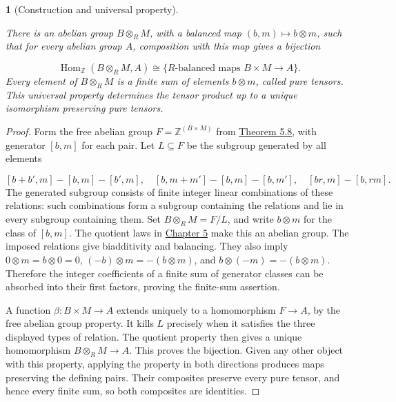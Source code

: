 \documentclass[11pt,a4paper]{article}
\newcommand{\mathheading}{}
\theoremstyle{plain}
\newtheorem*{plainstatement}{\mathheading}
\theoremstyle{definition}
\newenvironment{mathstatement}[3]{\renewcommand{\mathheading}{#1 #2}\begin{plainstatement}[#3]}{\end{plainstatement}}
\begin{document}
 
\begin{mathstatement}{Theorem}{6.2}{Construction and universal property}
\label{env-6-2}

There is an abelian group \(B\otimes_R M\), with a balanced map \((b,m)\mapsto b\otimes m\), such that for every abelian group \(A\), composition with this map gives a bijection

 \[\operatorname{Hom}_{\mathbb Z}(B\otimes_R M,A)\cong\{R\text{-balanced maps }B\times M\to A\}.\] 
Every element of \(B\otimes_R M\) is a finite sum of elements \(b\otimes m\), called \emph{pure tensors}. This universal property determines the tensor product up to a unique isomorphism preserving pure tensors.


\par{}\par

\end{mathstatement}
 
\begin{proof}

Form the free abelian group \(F=\mathbb Z^{(B\times M)}\) from \hyperref[env-5-8]{Theorem 5.8}, with generator \([b,m]\) for each pair. Let \(L\subseteq F\) be the subgroup generated by all elements

 \[
[b+b',m]-[b,m]-[b',m],\quad [b,m+m']-[b,m]-[b,m'],\quad [br,m]-[b,rm].
\] 
The generated subgroup consists of finite integer linear combinations of these relations: such combinations form a subgroup containing the relations and lie in every subgroup containing them. Set \(B\otimes_R M=F/L\), and write \(b\otimes m\) for the class of \([b,m]\). The quotient laws in \hyperref[chapter-05]{Chapter 5} make this an abelian group. The imposed relations give biadditivity and balancing. They also imply \(0\otimes m=b\otimes0=0\), \((-b)\otimes m=-(b\otimes m)\), and \(b\otimes(-m)=-(b\otimes m)\). Therefore the integer coefficients of a finite sum of generator classes can be absorbed into their first factors, proving the finite-sum assertion.


A function \(\beta:B\times M\to A\) extends uniquely to a homomorphism \(F\to A\), by the free abelian group property. It kills \(L\) precisely when it satisfies the three displayed types of relation. The quotient property then gives a unique homomorphism \(B\otimes_R M\to A\). This proves the bijection. Given any other object with this property, applying the property in both directions produces maps preserving the defining pairs. Their composites preserve every pure tensor, and hence every finite sum, so both composites are identities.


\end{proof}
 
\end{document}

